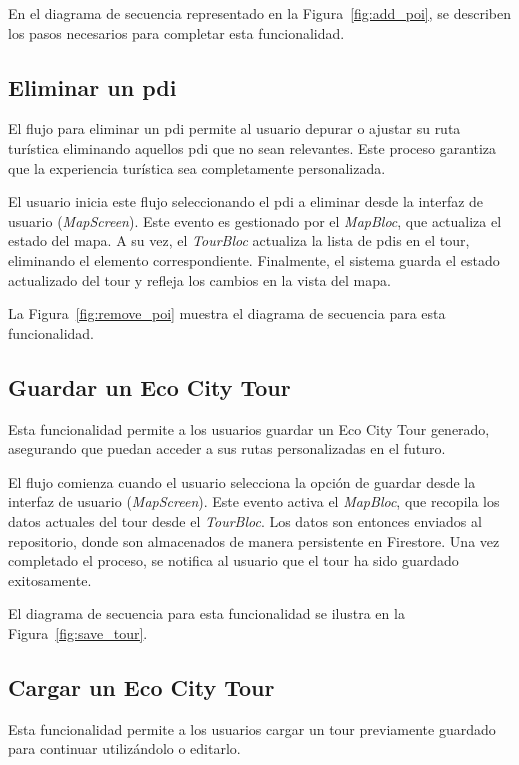 En el diagrama de secuencia representado en la Figura~\ref{fig:add_poi}, se describen los pasos necesarios para completar esta funcionalidad.

\subsection{Eliminar un \acrshort{pdi}}
El flujo para eliminar un \acrshort{pdi} permite al usuario depurar o ajustar su ruta turística eliminando aquellos \acrshort{pdi} que no sean relevantes. Este proceso garantiza que la experiencia turística sea completamente personalizada.

El usuario inicia este flujo seleccionando el \acrshort{pdi} a eliminar desde la interfaz de usuario (\textit{MapScreen}). Este evento es gestionado por el \textit{MapBloc}, que actualiza el estado del mapa. A su vez, el \textit{TourBloc} actualiza la lista de \acrshort{pdi}s en el tour, eliminando el elemento correspondiente. Finalmente, el sistema guarda el estado actualizado del tour y refleja los cambios en la vista del mapa.

La Figura~\ref{fig:remove_poi} muestra el diagrama de secuencia para esta funcionalidad.

\subsection{Guardar un Eco City Tour}
Esta funcionalidad permite a los usuarios guardar un Eco City Tour generado, asegurando que puedan acceder a sus rutas personalizadas en el futuro. 

El flujo comienza cuando el usuario selecciona la opción de guardar desde la interfaz de usuario (\textit{MapScreen}). Este evento activa el \textit{MapBloc}, que recopila los datos actuales del tour desde el \textit{TourBloc}. Los datos son entonces enviados al repositorio, donde son almacenados de manera persistente en Firestore. Una vez completado el proceso, se notifica al usuario que el tour ha sido guardado exitosamente.

El diagrama de secuencia para esta funcionalidad se ilustra en la Figura~\ref{fig:save_tour}.

\subsection{Cargar un Eco City Tour}
Esta funcionalidad permite a los usuarios cargar un tour previamente guardado para continuar utilizándolo o editarlo.

